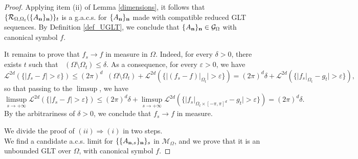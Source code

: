 \documentclass[10pt,a4paper]{amsart}
\DeclareMathOperator{\Ld}{\mathcal{L}^d}
\begin{document}
\begin{proof}
    Applying item (ii) of Lemma \ref{dimensions}, it follows that $\{\mathcal{R}_{\Omega,\Omega_t}(\{A_\mathbf n\}_\mathbf n)\}_t$ is a g.a.c.s. for $\{A_\mathbf n\}_\mathbf n$ made with compatible reduced GLT sequences. By Definition \ref{def_UGLT}, we conclude that $\{A_\mathbf n\}_\mathbf n\in\mathcal{G}_\Omega$ with canonical symbol $f$.
    
    It remains to prove that $f_s\to f$ in measure in $\Omega$. Indeed, for every $\delta>0$, there exists $t$ such that $\Ld(\Omega\setminus\Omega_t)\leq\delta$. As a consequence, for every $\varepsilon>0$, we have
    \begin{equation*}
        \mathcal{L}^{2d}(\{|f_s-f|>\varepsilon\})\leq (2\pi)^d\Ld(\Omega\setminus\Omega_t)+\mathcal{L}^{2d}(\{|(f_s-f)|_{\Omega_t}|>\varepsilon\})=(2\pi)^d\delta+\mathcal{L}^{2d}(\{|f_s|_{\Omega_t}-g_t|>\varepsilon\}),
    \end{equation*}
    so that passing to the $\limsup$, we have
    \begin{equation*}
        \limsup\limits_{s\to+\infty}\mathcal{L}^{2d}(\{|f_s-f|>\varepsilon\})\leq (2\pi)^d\delta+\limsup\limits_{s\to+\infty}\mathcal{L}^{2d}(\{|f_s|_{\Omega_t\times[-\pi,\pi]^d}-g_t|>\varepsilon\})=(2\pi)^d\delta.
    \end{equation*}
    By the arbitrariness of $\delta>0$, we conclude that $f_s\to f$ in measure.

    We divide the proof of $(ii)\Rightarrow(i)$ in two steps.\\
     We find a candidate a.c.s. limit for $\{\{A_{\mathbf n,s}\}_\mathbf n\}_s$ in $\mathcal{M}_\Omega$, and we prove that it is an unbounded GLT over $\Omega$, with canonical symbol $f$.
    

\end{proof}
\end{document}
